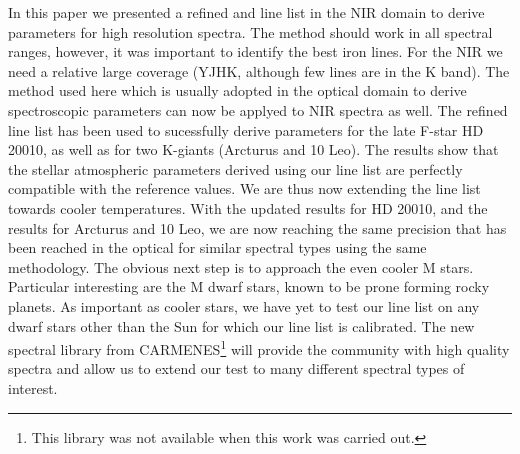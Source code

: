 \documentclass[a4paper,fleqn,usenatbib]{mnras}
\begin{document}
In this paper we presented a refined  and  line list in the NIR domain to
derive parameters for high resolution spectra. The method should work in all spectral ranges,
however, it was important to identify the best iron lines. For the NIR we need a relative large
coverage (YJHK, although few lines are in the K band). The method used here which is usually adopted
in the optical domain to derive spectroscopic parameters can now be applyed to NIR spectra as well. The 
refined line list has been used to sucessfully derive parameters for the late F-star HD 20010, as well as for 
two K-giants (Arcturus and 10 Leo). The results show that the stellar atmospheric parameters derived
using our line list are perfectly compatible with the reference values. We are thus now extending
the line list towards cooler temperatures. With the updated results for HD 20010, and the results
for Arcturus and 10 Leo, we are now reaching the same precision that has been reached in the optical
for similar spectral types using the same methodology. The obvious next step is to approach the even
cooler M stars. Particular interesting are the M dwarf stars, known to be prone forming rocky
planets. As important as cooler stars, we have yet to test our line list on any dwarf stars other
than the Sun for which our line list is calibrated. The new spectral library from
CARMENES\footnote{This library was not available when this work was carried out.}
\citep{Reiners2017} will provide the community with high quality spectra and allow us to extend our
test to many different spectral types of interest.


\end{document}
